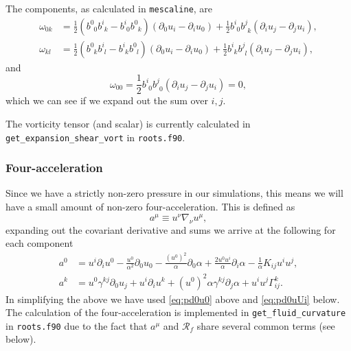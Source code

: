 \documentclass[a4paper]{article}
\newcommand{\ph}{\phantom}
\newcommand{\alp}{\alpha}
\newcommand{\Gam}{\Gamma}
\newcommand{\gam}{\gamma}
\newcommand{\pd}{\partial}
\newcommand{\mesc}{\texttt{mescaline}}
\begin{document}
The components, as calculated in \mesc, are
\begin{align}
	\omega_{0k} &= \frac{1}{2} \left(  b^0_{\ph{0}0} b^i_{\ph{i}k} - b^i_{\ph{i}0} b^0_{\ph{0}k} \right) \left(\pd_0 u_i - \pd_i u_0 \right) + \frac{1}{2} b^i_{\ph{i}0} b^j_{\ph{j}k} \left( \pd_i u_j - \pd_j u_i \right), \\
	\omega_{kl} &= \frac{1}{2} \left( b^0_{\ph{0}k} b^i_{\ph{i}l} - b^i_{\ph{i}k} b^0_{\ph{0}l} \right) \left( \pd_0 u_i - \pd_i u_0 \right) + \frac{1}{2} b^i_{\ph{i}k} b^j_{\ph{j}l} \left( \pd_i u_j - \pd_j u_i \right),
\end{align}
and
\begin{equation}
	\omega_{00}=\frac{1}{2} b^i_{\ph{i}0} b^j_{\ph{j}0} \left( \pd_i u_j - \pd_j u_i \right) = 0,
\end{equation}
which we can see if we expand out the sum over $i,j$.

The vorticity tensor (and scalar) is currently calculated in \texttt{get\_expansion\_shear\_vort} in \texttt{roots.f90}.


\subsubsection{Four-acceleration}

Since we have a strictly non-zero pressure in our simulations, this means we will have a small amount of non-zero four-acceleration. This is defined as
\begin{equation}
	a^\mu \equiv u^\nu \nabla_\nu u^\mu,
\end{equation}
expanding out the covariant derivative and sums we arrive at the following for each component
\begin{align}
	a^0 &= u^i \pd_i u^0 - \frac{u^0}{\alp^2}\pd_0 u_0 - \frac{(u^0)^2}{\alp}\pd_0\alp + \frac{2u^0u^i}{\alp} \pd_i\alp - \frac{1}{\alp}K_{ij}u^iu^j,\\
	a^k &= u^0 \gam^{kj}\pd_0 u_j + u^i \pd_i u^k + (u^0)^2\alp\gam^{kj}\pd_j\alp + u^i u^j \Gam^k_{ij}.
\end{align}
In simplifying the above we have used \eqref{eq:pd0u0} above and \eqref{eq:pd0uUi} below. The calculation of the four-acceleration is implemented in \texttt{get\_fluid\_curvature} in \texttt{roots.f90} due to the fact that $a^\mu$ and $\mathcal{R}_f$ share several common terms (see below).
\end{document}
